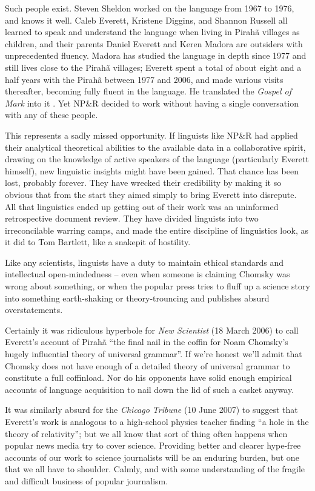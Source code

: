 \documentclass[output=paper,colorlinks,citecolor=brown
]{langscibook}
\begin{document}
Such people exist. Steven Sheldon worked on the language from
1967 to 1976, and knows it well. Caleb Everett, Kristene Diggins,
and Shannon Russell all learned to speak and understand the language
when living in Pirah{\~a} villages as children, and their parents
Daniel Everett and Keren Madora are outsiders with unprecedented
fluency. Madora has studied the language in depth since 1977 and
still lives close to the Pirah{\~a} villages; Everett spent a total
of about eight and a half years with the Pirah{\~a} between 1977
and 2006, and made various visits thereafter, becoming fully fluent
in the language. He translated the \textit{Gospel of Mark} into it
\citep{Everett86Mark}. Yet NP\&R decided to work without having a
single conversation with any of these people.

This represents a sadly missed opportunity. If linguists like NP\&R
had applied their analytical theoretical abilities to the available
data in a collaborative spirit, drawing on the knowledge of active
speakers of the language (particularly Everett himself), new linguistic
insights might have been gained. That chance has been lost, probably
forever. They have wrecked their credibility by making it so obvious
that from the start they aimed simply to bring Everett into disrepute.
All that linguistics ended up getting out of their work was an
uninformed retrospective document review. They have divided linguists
into two irreconcilable warring camps, and made the entire discipline
of linguistics look, as it did to Tom Bartlett, like a snakepit of
hostility.

Like any scientists, linguists have a duty to maintain ethical
standards and intellectual open-mindedness -- even when someone is
claiming Chomsky was wrong about something, or when the popular
press tries to fluff up a science story into something earth-shaking
or theory-trouncing and publishes absurd overstatements.

Certainly it was ridiculous hyperbole for
\textit{New Scientist} (18 March 2006)
to call Everett's account of Pirah{\~a} ``the final nail in the
coffin for Noam Chomsky's hugely influential theory of universal
grammar''. If we're honest we'll admit that Chomsky does not have
enough of a detailed theory of universal grammar to constitute a full
coffinload. Nor do his opponents have solid enough empirical accounts
of language acquisition to nail down the lid of such a casket anyway.

It was similarly absurd for the
\textit{Chicago Tribune} (10 June 2007)
to suggest that Everett's work is analogous to a high-school physics
teacher finding ``a hole in the theory of relativity''; but we all know
that sort of thing often happens when popular news media try to cover
science. Providing better and clearer hype-free accounts of our work
to science journalists will be an enduring burden, but one that we
all have to shoulder. Calmly, and with some understanding of the
fragile and difficult business of popular journalism.
\end{document}
